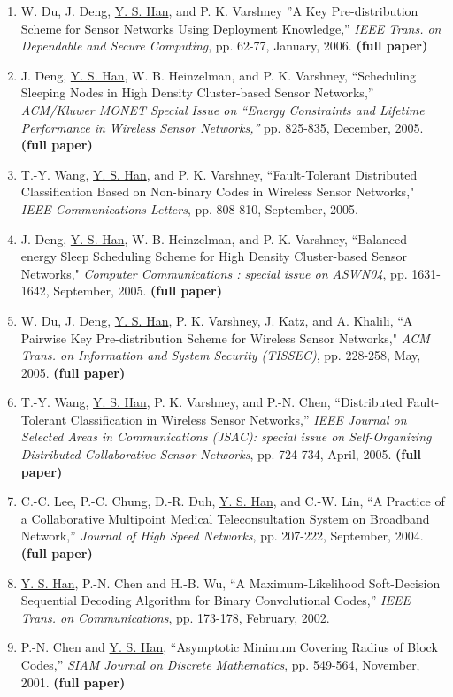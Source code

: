 \begin{llist}
\begin{itemize}
\begin{enumerate}
\item W. Du, J. Deng, \underline{Y. S. Han}, and P. K.
Varshney ''A Key Pre-distribution Scheme for Sensor Networks Using
Deployment Knowledge,'' {\it IEEE Trans. on Dependable and Secure
Computing},  pp. 62-77, January, 2006. {\bf (full paper)}

\item J. Deng, \underline{Y. S. Han}, W. B. Heinzelman, and P. K.
Varshney, ``Scheduling Sleeping Nodes in High Density Cluster-based
Sensor Networks,'' {\it ACM/Kluwer MONET Special Issue on ``Energy
Constraints and Lifetime Performance in Wireless Sensor Networks,''}
pp. 825-835, December, 2005. {\bf (full paper)}

\item T.-Y. Wang, \underline{Y. S. Han}, and P. K. Varshney,
``Fault-Tolerant Distributed Classification Based on Non-binary
Codes in Wireless Sensor Networks," {\it IEEE Communications
Letters}, pp. 808-810, September, 2005.


\item J. Deng, \underline{Y. S. Han}, W. B. Heinzelman, and P. K.
Varshney, ``Balanced-energy Sleep Scheduling Scheme for High
Density Cluster-based Sensor Networks," {\it Computer
Communications : special issue on ASWN04}, pp. 1631-1642,
September, 2005. {\bf (full paper)}

 \item W. Du, J. Deng, \underline{Y. S. Han}, P. K.
Varshney, J. Katz, and A. Khalili, ``A Pairwise Key
Pre-distribution Scheme for Wireless Sensor Networks," {\it  ACM
Trans. on Information and System Security (TISSEC)}, pp. 228-258,
May, 2005. {\bf (full paper)}




\item T.-Y. Wang, \underline{Y. S. Han}, P. K. Varshney, and P.-N.
Chen, ``Distributed Fault-Tolerant Classification in Wireless
Sensor Networks,'' {\it IEEE Journal on Selected Areas in
Communications (JSAC): special issue on Self-Organizing
Distributed Collaborative Sensor Networks}, pp. 724-734, April,
2005. {\bf (full paper)}



\item C.-C. Lee, P.-C. Chung, D.-R. Duh, \underline{Y. S. Han},
and C.-W. Lin, ``A Practice of a Collaborative Multipoint Medical
Teleconsultation System on Broadband Network,'' {\it Journal of
High Speed Networks}, pp. 207-222, September, 2004. {\bf (full
paper)}

\item \underline{Y. S. Han}, P.-N. Chen and H.-B. Wu, ``A
Maximum-Likelihood Soft-Decision Sequential Decoding Algorithm for
Binary Convolutional Codes,'' {\it IEEE Trans. on Communications},
pp. 173-178, February, 2002.
\item P.-N. Chen and \underline{Y. S. Han}, ``Asymptotic
Minimum Covering Radius of Block Codes,'' {\it SIAM Journal on
Discrete Mathematics}, pp. 549-564, November, 2001. {\bf (full
paper)}



\end{enumerate}
\end{itemize}
\end{llist}
